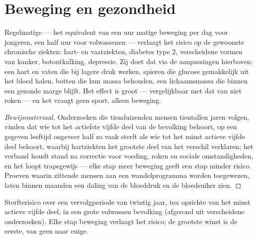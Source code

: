 \section{Beweging en gezondheid}

\begin{proposition}\label{prop:g10:sport-and-health:health}
Regelmatige  --- het equivalent van een uur matige
beweging per dag voor jongeren, een half uur voor volwassenen ---
verlaagt het risico op de gewoonste chronische ziekten: hart- en
vaatziekten, diabetes type 2, verscheidene vormen van kanker,
botontkalking, depressie. Zij doet dat via de aanpassingen hierboven: een
hart en vaten die bij lagere druk werken, spieren die glucose
gemakkelijk uit het bloed halen, botten die hun massa behouden, een
lichaamsmassa die binnen een gezonde marge blijft. Het effect is groot
--- vergelijkbaar met dat van niet roken --- en het vraagt geen sport,
alleen beweging.
\end{proposition}
\begin{proof}[Bewijsmateriaal]
Onderzoeken die tienduizenden mensen tientallen jaren volgen, vinden dat
wie tot het actiefste vijfde deel van de bevolking behoort, op een
gegeven leeftijd ongeveer half zo vaak sterft als wie tot het minst
actieve vijfde deel behoort, waarbij hartziekten het grootste deel van
het verschil verklaren; het verband houdt stand na correctie voor
voeding, roken en sociale omstandigheden, en het loopt trapsgewijs ---
elke stap meer beweging geeft een stap minder risico. Proeven waarin
zittende mensen aan een wandelprogramma worden toegewezen, laten binnen
maanden een daling van de bloeddruk en de bloedsuiker zien.
\end{proof}

\begin{omfigure}

{\small Sterfterisico over een vervolgperiode van twintig jaar, ten
opzichte van het minst actieve vijfde deel, in een grote volwassen
bevolking (afgerond uit verscheidene onderzoeken). Elke stap beweging
verlaagt het risico; de grootste winst is de eerste, van geen naar
enige.}
\end{omfigure}

